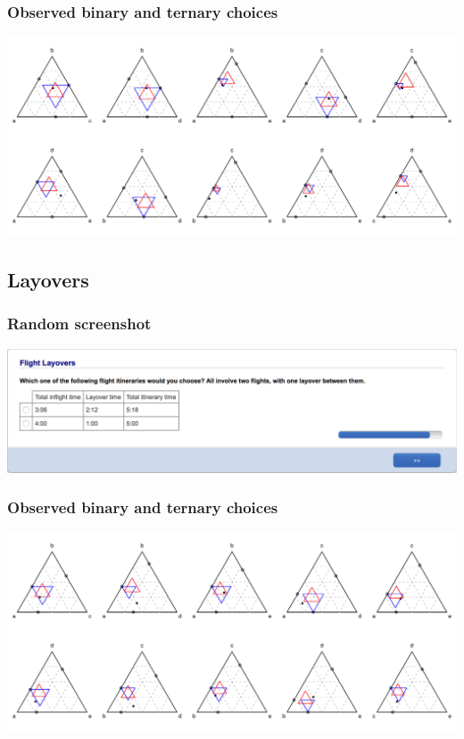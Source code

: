 \documentclass[11pt,letter]{article}
\begin{document}
\subsubsection*{Observed binary and ternary choices}

\includegraphics[width=15cm]{./Population_study_data/Simplexes/restaurants.pdf}

\pagebreak

\subsection*{Layovers}



\subsubsection*{Random screenshot}

\includegraphics[width=15cm]{Population_study_design/screenshot_layovers.png}

\subsubsection*{Observed binary and ternary choices}

\includegraphics[width=15cm]{./Population_study_data/Simplexes/layovers.pdf}
\end{document}
